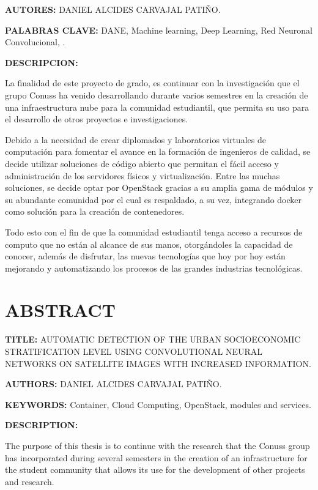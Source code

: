     \textbf{AUTORES:} DANIEL ALCIDES CARVAJAL PATIÑO.
    
    \textbf{PALABRAS CLAVE:} DANE, Machine learning, Deep Learning, Red Neuronal Convolucional, .	
    
    \textbf{DESCRIPCION:} 
    
    La finalidad de este proyecto de grado, es continuar con la investigación  que el grupo Conuss ha venido desarrollando durante varios semestres en la creación de una infraestructura nube para la comunidad estudiantil, que permita su uso para el desarrollo de otros proyectos e investigaciones.
    
    Debido a la necesidad de crear diplomados y laboratorios virtuales de computación para fomentar el avance en la formación de ingenieros de calidad, se decide utilizar soluciones de código abierto que permitan el fácil acceso y administración de los servidores físicos y virtualización. Entre las muchas soluciones, se decide optar por OpenStack gracias a su amplia gama de módulos y su abundante comunidad por el cual es respaldado, a su vez, integrando docker como solución para la creación de contenedores.
    
    Todo esto con el fin de que la comunidad estudiantil tenga acceso a recursos de computo que no están al alcance de sus manos, otorgándoles la capacidad de conocer, además de disfrutar, las nuevas tecnologías que hoy por hoy están mejorando y automatizando los procesos de las grandes industrias tecnológicas.
 
  
	\newpage\chapter*{ABSTRACT}
    \textbf{TITLE:} AUTOMATIC DETECTION OF THE URBAN SOCIOECONOMIC STRATIFICATION LEVEL USING CONVOLUTIONAL NEURAL NETWORKS ON SATELLITE IMAGES WITH INCREASED INFORMATION.
    
    \textbf{AUTHORS:} DANIEL ALCIDES CARVAJAL PATIÑO.
    
    \textbf{KEYWORDS:} Container, Cloud Computing, OpenStack, modules and services.
    
    \textbf{DESCRIPTION:} 
    
    The purpose of this thesis is to continue with the research that the Conuss group has incorporated during several semesters in the creation of an infrastructure for the student community that allows its use for the development of other projects and research.
    
